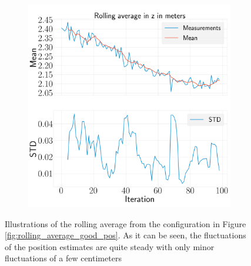 \documentclass[../Head/report.tex]{subfiles}
\begin{document}
\begin{figure}[H]
\begin{subfigure}[t]{.30\textwidth}
        \caption{}
        \label{fig:rolling_average_in_y_test1}
    \end{subfigure}
     \hspace{0.2em}
    \begin{subfigure}[t]{.30\textwidth}
        \centering
        \includegraphics[width=\textwidth]{../Figures/analyse_rolling_average/test1/Calculated_rolling_average_in_z_with_mean_and_STD.png}
        \caption{}
        \label{fig:rolling_average_in_z_test1}
    \end{subfigure}
    \caption{Illustrations of the rolling average from the configuration in Figure \ref{fig:rolling_average_good_pos}. As it can be seen, the fluctuations of the position estimates are quite steady with only minor fluctuations of a few centimeters}
    \label{fig:rolling_average_pos_test1}
\end{figure}
\end{document}
